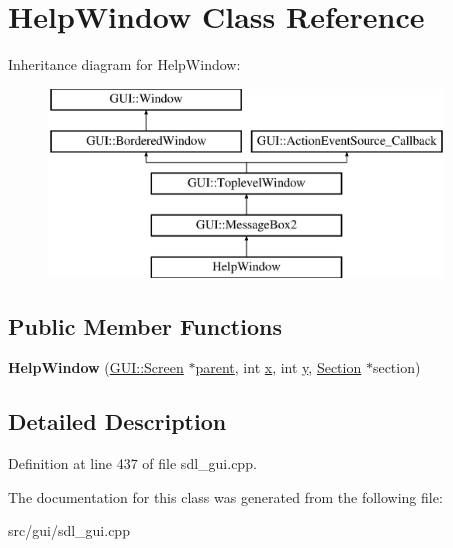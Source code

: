 \hypertarget{classHelpWindow}{\section{Help\-Window Class Reference}
\label{classHelpWindow}
}
Inheritance diagram for Help\-Window\-:\begin{figure}[H]
\begin{center}
\leavevmode
\includegraphics[height=5.000000cm]{classHelpWindow}
\end{center}
\end{figure}
\subsection*{Public Member Functions}
\begin{DoxyCompactItemize}
\item 
\hypertarget{classHelpWindow_a187ef189ba63c6c5ecf56aea58890d91}{{\bfseries Help\-Window} (\hyperlink{classGUI_1_1Screen}{G\-U\-I\-::\-Screen} $\ast$\hyperlink{classGUI_1_1Window_a2e593ff65e7702178d82fe9010a0b539}{parent}, int \hyperlink{classGUI_1_1Window_a6ca6a80ca00c9e1d8ceea8d3d99a657d}{x}, int \hyperlink{classGUI_1_1Window_a0ee8e923aff2c3661fc2e17656d37adf}{y}, \hyperlink{classSection}{Section} $\ast$section)}\label{classHelpWindow_a187ef189ba63c6c5ecf56aea58890d91}

\end{DoxyCompactItemize}


\subsection{Detailed Description}


Definition at line 437 of file sdl\-\_\-gui.\-cpp.



The documentation for this class was generated from the following file\-:\begin{DoxyCompactItemize}
\item 
src/gui/sdl\-\_\-gui.\-cpp\end{DoxyCompactItemize}
